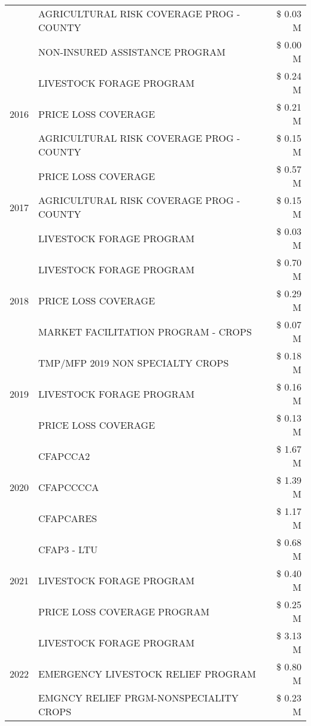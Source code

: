 \begin{tabular}{llr}
 & AGRICULTURAL RISK COVERAGE PROG - COUNTY & \$ 0.03 M \\
 & NON-INSURED ASSISTANCE PROGRAM & \$ 0.00 M \\
\cline{1-3}
\multirow[t]{3}{*}{2016} & LIVESTOCK FORAGE PROGRAM & \$ 0.24 M \\
 & PRICE LOSS COVERAGE & \$ 0.21 M \\
 & AGRICULTURAL RISK COVERAGE PROG - COUNTY & \$ 0.15 M \\
\cline{1-3}
\multirow[t]{3}{*}{2017} & PRICE LOSS COVERAGE & \$ 0.57 M \\
 & AGRICULTURAL RISK COVERAGE PROG - COUNTY & \$ 0.15 M \\
 & LIVESTOCK FORAGE PROGRAM & \$ 0.03 M \\
\cline{1-3}
\multirow[t]{3}{*}{2018} & LIVESTOCK FORAGE PROGRAM & \$ 0.70 M \\
 & PRICE LOSS COVERAGE & \$ 0.29 M \\
 & MARKET FACILITATION PROGRAM - CROPS & \$ 0.07 M \\
\cline{1-3}
\multirow[t]{3}{*}{2019} & TMP/MFP 2019 NON SPECIALTY CROPS & \$ 0.18 M \\
 & LIVESTOCK FORAGE PROGRAM & \$ 0.16 M \\
 & PRICE LOSS COVERAGE & \$ 0.13 M \\
\cline{1-3}
\multirow[t]{3}{*}{2020} & CFAPCCA2 & \$ 1.67 M \\
 & CFAPCCCCA & \$ 1.39 M \\
 & CFAPCARES & \$ 1.17 M \\
\cline{1-3}
\multirow[t]{3}{*}{2021} & CFAP3 - LTU & \$ 0.68 M \\
 & LIVESTOCK FORAGE PROGRAM & \$ 0.40 M \\
 & PRICE LOSS COVERAGE PROGRAM & \$ 0.25 M \\
\cline{1-3}
\multirow[t]{3}{*}{2022} & LIVESTOCK FORAGE PROGRAM & \$ 3.13 M \\
 & EMERGENCY LIVESTOCK RELIEF PROGRAM & \$ 0.80 M \\
 & EMGNCY RELIEF PRGM-NONSPECIALITY CROPS & \$ 0.23 M \\
\cline{1-3}
\bottomrule
\end{tabular}
